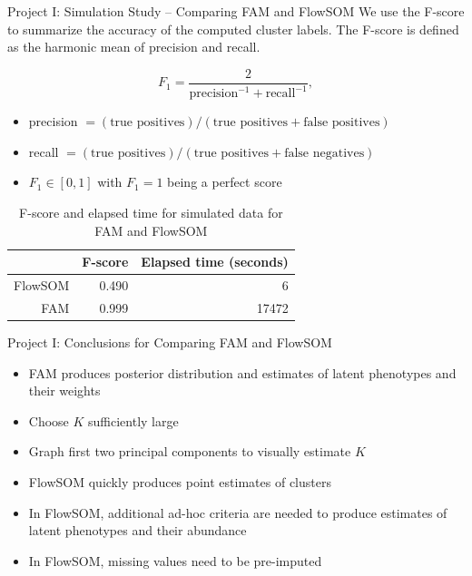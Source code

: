 \documentclass[ignorenonframetext,]{beamer}
\newcommand{\p}[1]{\left(#1\right)}
\newcommand{\bk}[1]{\left[#1\right]}
\begin{document}
\begin{frame}{Project I: Simulation Study -- Comparing FAM and FlowSOM}
We use the F-score to summarize the accuracy of the computed cluster labels.
The F-score is defined as the harmonic mean of precision and recall.

$$
F_1 = \frac{2}{\text{precision}^{-1} + \text{recall}^{-1}},
$$

\begin{itemize}
  \item precision $=\p{\text{true positives}}/\p{\text{true positives} + \text{false positives}}$ 
  \item recall $=\p{\text{true positives}} / \p{\text{true positives} + \text{false negatives}}$
  \item $F_1 \in \bk{0,1}$ with $F_1=1$ being a perfect score
\end{itemize}

\begin{table}
\begin{center}
\begin{tabular}{rrr}
  \hline
 & F-score & Elapsed time (seconds) \\ 
  \hline
  FlowSOM & 0.490 & 6 \\ 
  FAM & 0.999 & 17472 \\ 
   \hline
\end{tabular}
\end{center}
\caption{F-score and elapsed time for simulated data for FAM and FlowSOM}
\end{table}
\end{frame}

\begin{frame}{Project I: Conclusions for Comparing FAM and FlowSOM}
  \begin{itemize}
    \setlength\itemsep{1em}
    \item FAM produces posterior distribution and estimates of latent phenotypes and their weights
    \item Choose $K$ sufficiently large
    \item Graph first two principal components to visually estimate $K$
    \item FlowSOM quickly produces point estimates of clusters
    \item In FlowSOM, additional ad-hoc criteria are needed to produce estimates of latent phenotypes and their abundance
    \item In FlowSOM, missing values need to be pre-imputed
  \end{itemize}
\end{frame}
\end{document}
